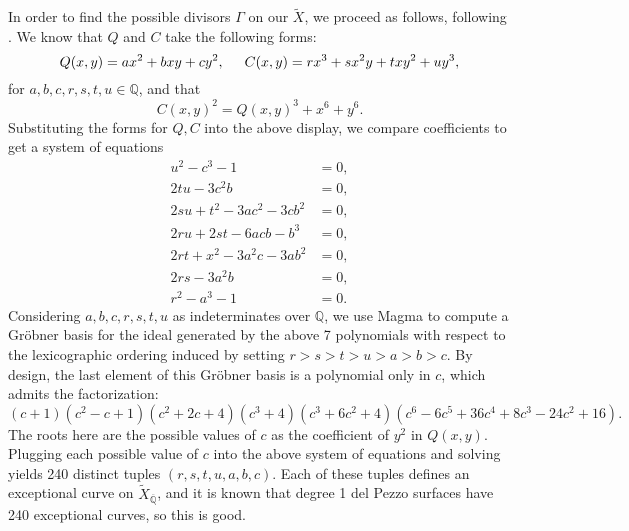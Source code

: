 \documentclass[12pt,twoside]{reedthesis}
\theoremstyle{plain}
\theoremstyle{definition}
\theoremstyle{remark}
\newcommand{\QQ}{\mathbb{Q}}
\begin{document}
In order to find the possible divisors $\Gamma$ on our $\widetilde{X}$, we proceed as follows, following \cite{tonyThesis}. We know that $Q$ and $C$ take the following forms:
\[
Q(x,y)=ax^2+bxy+cy^2,\hspace{0.5cm} C(x,y)=rx^3+sx^2y+txy^2+uy^3,
\]
for $a,b,c,r,s,t,u\in\QQ$, and that
\[
C(x,y)^2=Q(x,y)^3+x^6+y^6.
\]
Substituting the forms for $Q,C$ into the above display, we compare coefficients to get a system of equations
\begin{align*}
u^2-c^3-1&=0,\\
2tu-3c^2b&=0,\\
2su+t^2-3ac^2-3cb^2&=0,\\
2ru+2st-6acb-b^3&=0,\\
2rt+x^2-3a^2c-3ab^2&=0,\\
2rs-3a^2b&=0,\\
r^2-a^3-1&=0.
\end{align*}
Considering $a,b,c,r,s,t,u$ as indeterminates over $\QQ$, we use Magma to compute a Gr\"obner basis for the ideal generated by the above 7 polynomials with respect to the lexicographic ordering induced by setting $r>s>t>u>a>b>c$. By design, the last element of this Gr\"obner basis is a polynomial only in $c$, which admits the factorization:
\[
(c+1)(c^2-c+1)(c^2+2c+4)(c^3+4)(c^3+6c^2+4)(c^6-6c^5+36c^4+8c^3-24c^2+16).
\]
The roots here are the possible values of $c$ as the coefficient of $y^2$ in $Q(x,y)$. Plugging each possible value of $c$ into the above system of equations and solving yields 240 distinct tuples $(r,s,t,u,a,b,c)$. Each of these tuples defines an exceptional curve on $\widetilde{X}_{\overline{\QQ}}$, and it is known that degree 1 del Pezzo surfaces have 240 exceptional curves, so this is good. 
\end{document}
